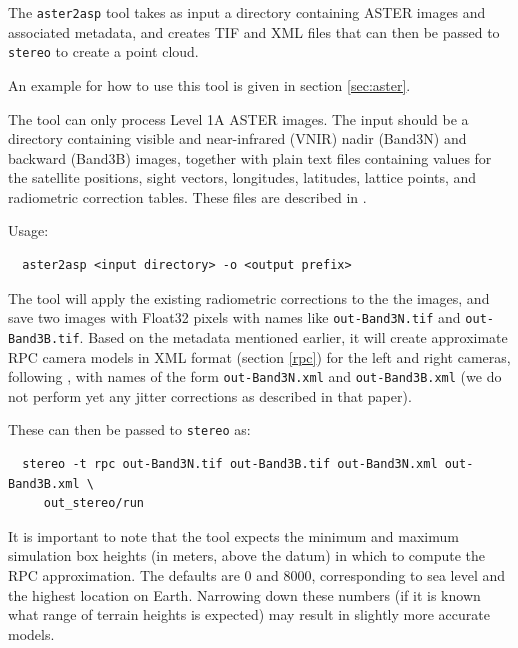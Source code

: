 The \texttt{aster2asp} tool takes as input a directory containing ASTER images and associated 
metadata, and creates TIF and XML files that can then be passed to \texttt{stereo} to create
a point cloud. 

An example for how to use this tool is given in section \ref{sec:aster}.

The tool can only process Level 1A ASTER images. The input should be a
directory containing visible and near-infrared (VNIR) nadir (Band3N) and
backward (Band3B) images, together with plain text files containing
values for the satellite positions, sight vectors, longitudes,
latitudes, lattice points, and radiometric correction tables. These
files are described in \cite{abrams2002aster}.

Usage:
\begin{verbatim}
  aster2asp <input directory> -o <output prefix>
\end{verbatim}

The tool will apply the existing radiometric corrections to the the
images, and save two images with Float32 pixels with names like
\texttt{out-Band3N.tif} and \texttt{out-Band3B.tif}. Based on the
metadata mentioned earlier, it will create approximate RPC camera models
in XML format (section \ref{rpc}) for the left and right cameras,
following \cite{girod2015improvement}, with names of the form
\texttt{out-Band3N.xml} and \texttt{out-Band3B.xml} (we do not perform
yet any jitter corrections as described in that paper).

These can then be passed to \texttt{stereo} as:
\begin{verbatim}
  stereo -t rpc out-Band3N.tif out-Band3B.tif out-Band3N.xml out-Band3B.xml \ 
     out_stereo/run
\end{verbatim}

It is important to note that the tool expects the minimum and maximum
simulation box heights (in meters, above the datum) in which to compute
the RPC approximation. The defaults are 0 and 8000, corresponding to sea
level and the highest location on Earth. Narrowing down these numbers
(if it is known what range of terrain heights is expected) may result in
slightly more accurate models.

